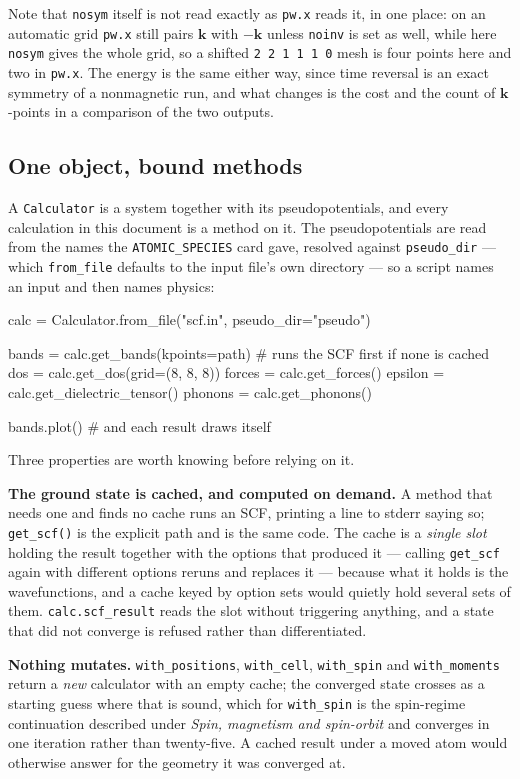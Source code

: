\documentclass[11pt,a4paper]{article}
\newcommand{\code}[1]{\texttt{\small #1}}
\begin{document}
Note that \code{nosym} itself is not read exactly as \code{pw.x} reads it, in
one place: on an automatic grid \code{pw.x} still pairs $\mathbf k$ with
$-\mathbf k$ unless \code{noinv} is set as well, while here \code{nosym} gives
the whole grid, so a shifted \code{2 2 1 1 1 0} mesh is four points here and
two in \code{pw.x}. The energy is the same either way, since time reversal is
an exact symmetry of a nonmagnetic run, and what changes is the cost and the
count of $\mathbf k$-points in a comparison of the two outputs.

\subsection*{One object, bound methods}

A \code{Calculator} is a system together with its pseudopotentials, and every
calculation in this document is a method on it. The pseudopotentials are read
from the names the \code{ATOMIC\_SPECIES} card gave, resolved against
\code{pseudo\_dir} --- which \code{from\_file} defaults to the input file's own
directory --- so a script names an input and then names physics:

\begin{pycode}
calc = Calculator.from_file("scf.in", pseudo_dir="pseudo")

bands = calc.get_bands(kpoints=path)      # runs the SCF first if none is cached
dos = calc.get_dos(grid=(8, 8, 8))
forces = calc.get_forces()
epsilon = calc.get_dielectric_tensor()
phonons = calc.get_phonons()

bands.plot()                              # and each result draws itself
\end{pycode}

Three properties are worth knowing before relying on it.

\textbf{The ground state is cached, and computed on demand.} A method that needs
one and finds no cache runs an SCF, printing a line to stderr saying so;
\code{get\_scf()} is the explicit path and is the same code. The cache is a
\emph{single slot} holding the result together with the options that produced
it --- calling \code{get\_scf} again with different options reruns and replaces
it --- because what it holds is the wavefunctions, and a cache keyed by option
sets would quietly hold several sets of them. \code{calc.scf\_result} reads the
slot without triggering anything, and a state that did not converge is refused
rather than differentiated.

\textbf{Nothing mutates.} \code{with\_positions}, \code{with\_cell},
\code{with\_spin} and \code{with\_moments} return a \emph{new} calculator with an empty cache; the
converged state crosses as a starting guess where that is sound, which for
\code{with\_spin} is the spin-regime continuation described under
\emph{Spin, magnetism and spin-orbit} and converges in one iteration rather
than twenty-five. A cached result under a moved atom
would otherwise answer for the geometry it was converged at.
\end{document}
